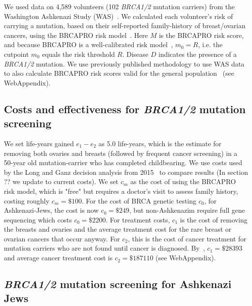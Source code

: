 \documentclass[11pt, letterpaper]{article}
\begin{document}
We used data on 4,589 volunteers (102 \textit{BRCA1/2} mutation carriers) from the Washington Ashkenazi Study (WAS)~\citep{STRUEWING1997}.  We calculated each volunteer's risk of carrying a mutation, based on their self-reported family-history of breast/ovarian cancers, using the BRCAPRO risk model~\citep{Parmigiani1998}.  Here $M$ is the BRCAPRO risk score, and because BRCAPRO is a well-calibrated risk model~\citep{Best2019}, $m_0=R$, i.e. the cutpoint $m_0$ equals the risk threshold $R$. Disease $D$ indicates the presence of a \textit{BRCA1/2} mutation.  We use previously published methodology to use WAS data to also calculate BRCAPRO risk scores valid for the general population~\citep{Best2019} (see WebAppendix).


\subsection{Costs and effectiveness for \textit{BRCA1/2} mutation screening}
\label{sec:CostsEffBRCA}

We set life-years gained $e_1-e_2$ as 5.0 life-years, which is the estimate for removing both ovaries and breasts (followed by frequent cancer screening) in a 50-year old mutation-carrier who has completed childbearing.  We use costs used by the Long and Ganz decision analysis from 2015~\citep{Long2015} to compare results (In section ?? we update to current costs).  We set $c_m$ as the cost of using the BRCAPRO risk model, which is "free" but requires a doctor's visit to assess family history, costing roughly $c_m=\$100$.  For the cost of BRCA genetic testing $c_0$,  for Ashkenazi-Jews, the cost is now $c_0=\$249$, but non-Ashkenazim require full gene sequencing which costs $c_0=\$2200$.   For treatment costs, $c_1$ is the cost of removing the breasts and ovaries and the average treatment cost for the rare breast or ovarian cancers that occur anyway.  For $c_2$, this is the cost of cancer treatment for mutation carriers who are not found until cancer is diagnosed.  By~\citep{Long2015}, $c_1=\$28393$ and average cancer treatment cost is $c_2=\$187110$ (see WebAppendix).

\subsection{\textit{BRCA1/2} mutation screening for Ashkenazi Jews}
\label{sec:BRCAAJs}
\end{document}
